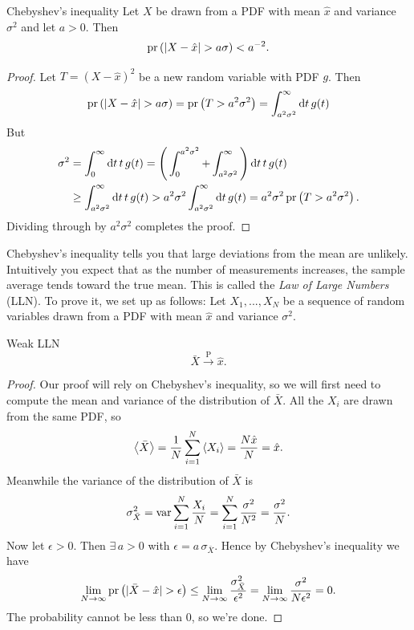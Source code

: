 \begin{theorem}{Chebyshev's inequality}{}
  Let $X$ be drawn from a PDF with mean $\hat{x}$ and variance
  $\sigma^2$ and let $a>0$. Then
  \begin{equation*}
    \pr{|X-\hat{x}|>a\sigma}<a^{-2}.
  \end{equation*}
  \begin{proof}
    Let $T=(X-\hat{x})^2$ be a new random variable with PDF $g$. Then
    \begin{equation*}
      \pr{|X-\hat{x}|>a\sigma}=\pr{T>a^2\sigma^2}
                              =\int_{a^2\sigma^2}^\infty\dd{t}g(t)
    \end{equation*}
    But
    \begin{equation*}
      \begin{aligned}
        \sigma^2&=\int_{0}^\infty\dd{t}t\,g(t)
                =\Bigg(\int_0^{a^2\sigma^2}
                     +\int_{a^2\sigma^2}^\infty\Bigg)\dd{t}t\,g(t)\\
                &\geq\int_{a^2\sigma^2}^\infty\dd{t}t\,g(t)
                >a^2\sigma^2\int_{a^2\sigma^2}^\infty\dd{t}g(t)
                =a^2\sigma^2\operatorname{pr}\left(T>a^2\sigma^2\right).
      \end{aligned}
    \end{equation*}
   Dividing through by $a^2\sigma^2$ completes the proof.
  \end{proof} 
\end{theorem}
Chebyshev's inequality tells you that large deviations from the mean are
unlikely. Intuitively you expect that as the number of measurements
increases, the sample average tends toward the true mean. This is
called the {\it Law of Large Numbers}
(LLN). To prove it, we set up as follows: Let $X_1,...,X_N$ be a sequence 
of random variables drawn from a PDF
with mean $\hat{x}$ and variance $\sigma^2$.
\begin{theorem}{Weak LLN}{}
  $$
    \bar{X}\xrightarrow{\text{P}}\hat{x}.
  $$
  \begin{proof} Our proof will rely on Chebyshev's inequality, so we will
    first need to compute the mean and variance of the distribution of
    $\bar{X}$. All the $X_i$ are drawn from the same PDF, so
    $$
      \ev{\bar{X}}=\frac{1}{N}\sum_{i=1}^N\ev{X_i}
                  =\frac{N\hat{x}}{N}=\hat{x}.
    $$
    Meanwhile the variance of the distribution of $\bar{X}$ is
    $$
      \sigma^2_{\bar{X}}
      =\operatorname{var}\sum_{i=1}^N \frac{X_i}{N}
      =\sum_{i=1}^N\frac{\sigma^2}{N^2}
      =\frac{\sigma^2}{N}.
    $$
    Now let $\epsilon>0$. Then $\exists\,a>0$ with 
    $\epsilon=a\,\sigma_{\bar{X}}$. Hence by Chebyshev's
    inequality we have
    $$
      \lim_{N\to\infty}\pr{|\bar{X}-\hat{x}|>\epsilon}
       \leq\lim_{N\to\infty}\frac{\sigma^2_{\bar{X}}}{\epsilon^2}
       =\lim_{N\to\infty}\frac{\sigma^2}{N\epsilon^2}=0.
    $$
    The probability cannot be less than 0, so we're done.
  \end{proof}
\end{theorem}
